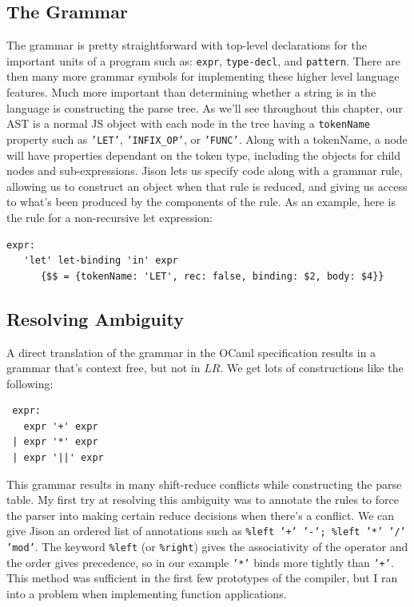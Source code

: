 \documentclass[12pt,a4paper,twoside,openright]{report}
\begin{document}
\subsection{The Grammar}
The grammar is pretty straightforward with top-level declarations for the important units of a program such as: {\tt expr}, {\tt type-decl}, and {\tt pattern}.
There are then many more grammar symbols for implementing these higher level language features.
Much more important than determining whether a string is in the language is constructing the parse tree.
As we'll see throughout this chapter, our AST is a normal JS object with each node in the tree having a {\tt tokenName} property such as {\tt 'LET'}, {\tt 'INFIX\_OP'}, or {\tt 'FUNC'}.
Along with a tokenName, a node will have properties dependant on the token type, including the objects for child nodes and sub-expressions.
Jison lets us specify code along with a grammar rule, allowing us to construct an object when that rule is reduced, and giving us access to what's been produced by the components of the rule.
As an example, here is the rule for a non-recursive let expression:
\begin{verbatim}
expr:
   'let' let-binding 'in' expr
      {$$ = {tokenName: 'LET', rec: false, binding: $2, body: $4}} \end{verbatim}
\subsection{Resolving Ambiguity}
A direct translation of the grammar in the OCaml specification results in a grammar that's context free, but not in $LR$. We get lots of constructions like the following:
\begin{verbatim} expr:
   expr '+' expr
 | expr '*' expr
 | expr '||' expr \end{verbatim}
This grammar results in many shift-reduce conflicts while constructing the parse table.
My first try at resolving this ambiguity was to annotate the rules to force the parser into making certain reduce decisions when there's a conflict.
We can give Jison an ordered list of annotations such as {\tt \%left '+' '-'; \%left '*' '/' 'mod'}.
The keyword {\tt \%left} (or {\tt \%right}) gives the associativity of the operator and the order gives precedence, so in our example {\tt '*'} binds more tightly than {\tt '+'}.
This method was sufficient in the first few prototypes of the compiler, but I ran into a problem when implementing function applications.
\end{document}
